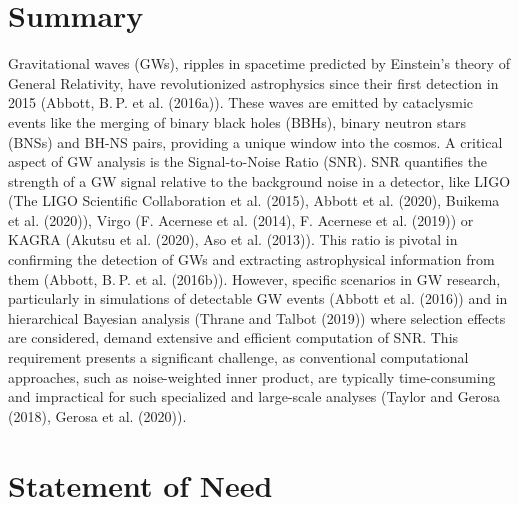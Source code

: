 \documentclass[10pt,a4paper,onecolumn]{article}
\begin{document}
\section{Summary}\label{summary}

Gravitational waves (GWs), ripples in spacetime predicted by Einstein's
theory of General Relativity, have revolutionized astrophysics since
their first detection in 2015 (Abbott, B. P. et al. (2016a)). These
waves are emitted by cataclysmic events like the merging of binary black
holes (BBHs), binary neutron stars (BNSs) and BH-NS pairs, providing a
unique window into the cosmos. A critical aspect of GW analysis is the
Signal-to-Noise Ratio (SNR). SNR quantifies the strength of a GW signal
relative to the background noise in a detector, like LIGO (The LIGO
Scientific Collaboration et al. (2015), Abbott et al. (2020), Buikema et
al. (2020)), Virgo (F. Acernese et al. (2014), F. Acernese et al.
(2019)) or KAGRA (Akutsu et al. (2020), Aso et al. (2013)). This ratio
is pivotal in confirming the detection of GWs and extracting
astrophysical information from them (Abbott, B. P. et al. (2016b)).
However, specific scenarios in GW research, particularly in simulations
of detectable GW events (Abbott et al. (2016)) and in hierarchical
Bayesian analysis (Thrane and Talbot (2019)) where selection effects are
considered, demand extensive and efficient computation of SNR. This
requirement presents a significant challenge, as conventional
computational approaches, such as noise-weighted inner product, are
typically time-consuming and impractical for such specialized and
large-scale analyses (Taylor and Gerosa (2018), Gerosa et al. (2020)).

\section{Statement of Need}\label{statement-of-need}
\end{document}
